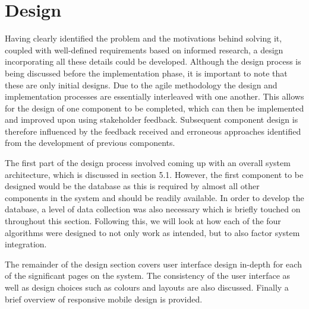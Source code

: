 \chapter{Design}
\label{Chapter:Design}
Having clearly identified the problem and the motivations behind solving it, coupled with well-defined requirements based on informed research, a design incorporating all these details could be developed. Although the design process is being discussed before the implementation phase, it is important to note that these are only initial designs. Due to the agile methodology the design and implementation processes are essentially interleaved with one another. This allows for the design of one component to be completed, which can then be implemented and improved upon using stakeholder feedback. Subsequent component design is therefore influenced by the feedback received and erroneous approaches identified from the development of previous components.

The first part of the design process involved coming up with an overall system architecture, which is discussed in section 5.1. However, the first component to be designed would be the database as this is required by almost all other components in the system and should be readily available. In order to develop the database, a level of data collection was also necessary which is briefly touched on throughout this section. Following this, we will look at how each of the four algorithms were designed to not only work as intended, but to also factor system integration.

The remainder of the design section covers user interface design in-depth for each of the significant pages on the system. The consistency of the user interface as well as design choices such as colours and layouts are also discussed. Finally a brief overview of responsive mobile design is provided.







